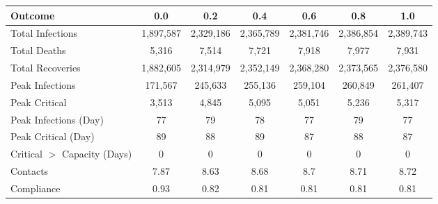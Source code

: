 \begin{table}[ht]
\centering
\begin{tabular}{lcccccc}
  \hline
Outcome & 0.0 & 0.2 & 0.4 & 0.6 & 0.8 & 1.0 \\ 
  \hline
Total Infections & 1,897,587 & 2,329,186 & 2,365,789 & 2,381,746 & 2,386,854 & 2,389,743 \\ 
  Total Deaths &     5,316 &     7,514 &     7,721 &     7,918 &     7,977 &     7,931 \\ 
  Total Recoveries & 1,882,605 & 2,314,979 & 2,352,149 & 2,368,280 & 2,373,565 & 2,376,580 \\ 
  Peak Infections &   171,567 &   245,633 &   255,136 &   259,104 &   260,849 &   261,407 \\ 
  Peak Critical &     3,513 &     4,845 &     5,095 &     5,051 &     5,236 &     5,317 \\ 
  Peak Infections (Day) &        77 &        79 &        78 &        77 &        79 &        77 \\ 
  Peak Critical (Day) &        89 &        88 &        89 &        87 &        88 &        87 \\ 
  Critical $>$ Capacity (Days) &         0 &         0 &         0 &         0 &         0 &         0 \\ 
  Contacts &      7.87 &      8.63 &      8.68 &       8.7 &      8.71 &      8.72 \\ 
  Compliance &      0.93 &      0.82 &      0.81 &      0.81 &      0.81 &      0.81 \\ 
   \hline
\end{tabular}
\end{table}
